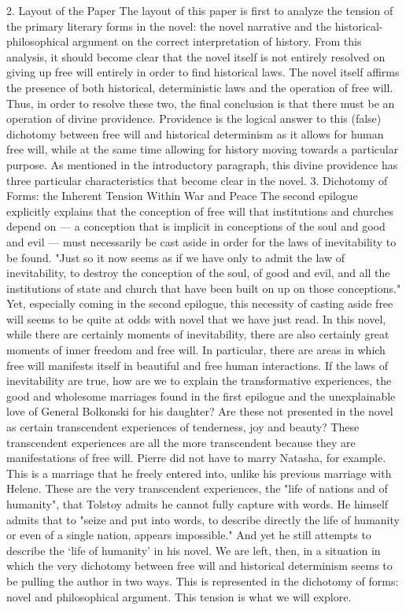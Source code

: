 2. Layout of the Paper
The layout of this paper is first to analyze the tension of the primary literary forms in the novel: the novel narrative and the historical-philosophical argument on the correct interpretation of history. From this analysis, it should become clear that the novel itself is not entirely resolved on giving up free will entirely in order to find historical laws. The novel itself affirms the presence of both historical, deterministic laws and the operation of free will. Thus, in order to resolve these two, the final conclusion is that there must be an operation of divine providence. Providence is the logical answer to this (false) dichotomy between free will and historical determinism as it allows for human free will, while at the same time allowing for history moving towards a particular purpose. As mentioned in the introductory paragraph, this divine providence has three particular characteristics that become clear in the novel. 
3. Dichotomy of Forms: the Inherent Tension Within War and Peace  
The second epilogue explicitly explains that the conception of free will that institutions and churches depend on —  a conception that is implicit in conceptions of the soul and good and evil — must necessarily be cast aside in order for the laws of inevitability to be found. "Just so it now seems as if we have only to admit the law of inevitability, to destroy the conception of the soul, of good and evil, and all the institutions of state and church that have been built on up on those conceptions." Yet, especially coming in the second epilogue, this necessity of casting aside free will seems to be quite at odds with novel that we have just read. In this novel, while there are certainly moments of inevitability, there are also certainly great moments of inner freedom and free will. In particular, there are areas in which free will manifests itself in beautiful and free human interactions. 
If the laws of inevitability are true, how are we to explain the transformative experiences, the good and wholesome marriages found in the first epilogue and the unexplainable love of General Bolkonski for his daughter?  Are these not presented in the novel as certain transcendent experiences of tenderness, joy and beauty?  These transcendent experiences are all the more transcendent because they are manifestations of free will. Pierre did not have to marry Natasha, for example. This is a marriage that he freely entered into, unlike his previous marriage with Helene. These are the very transcendent experiences, the "life of nations and of humanity", that Tolstoy admits he cannot fully capture with words. He himself admits that to "seize and put into words, to describe directly the life of humanity or even of a single nation, appears impossible."  And yet he still attempts to describe the ‘life of humanity’ in his novel. We are left, then, in a situation in which the very dichotomy between free will and historical determinism seems to be pulling the author in two ways.  This is represented in the dichotomy of forms: novel and philosophical argument.  This tension is what we will explore.  
